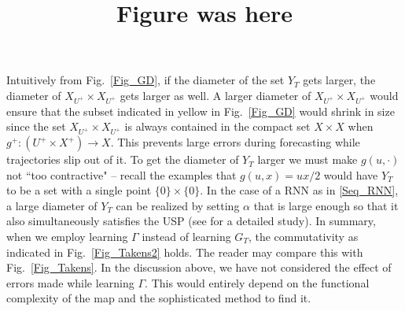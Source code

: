 \documentclass[12 pt]{article}
\begin{document}
Intuitively from Fig.~\ref{Fig_GD}, if the  diameter of the set $Y_T$ gets larger, the diameter of $X_{U^{+}} \times X_{U^{+}}$ gets larger as well. 
A larger diameter of $X_{U^{+}} \times X_{U^{+}}$ would ensure that the subset indicated in yellow in Fig.~\ref{Fig_GD} would shrink in size since the set $X_{U^{+}} \times X_{U^{+}}$ is always contained in the compact set $X \times X$ when $g^+:(U^+ \times X^+) \to X$. This prevents large errors during forecasting while trajectories slip out of it. To get the diameter of $Y_T$ larger we must make $g(u,\cdot)$  not ``too contractive" -- recall the examples that $g(u,x) = ux/2$ would have $Y_T$  to be a set with a single point $\{0\} \times \{0\}$.  In the case of a RNN as in \eqref{Seq_RNN}, a large diameter of $Y_T$ can be realized by setting $\alpha$ that is large enough so that it also simultaneously satisfies the USP (see \cite{manjunath2020stability} for a detailed study).  In summary, when we employ learning $\Gamma$ instead of learning $G_T$, the commutativity as indicated in  Fig.~\ref{Fig_Takens2} holds. The reader may compare this with Fig.~\ref{Fig_Takens}. In the discussion above, we have not considered the effect of errors made while learning $\Gamma$. This would entirely depend on the functional complexity of the map and the sophisticated method to find it. 

\title{Figure was here}
 
\end{document}
